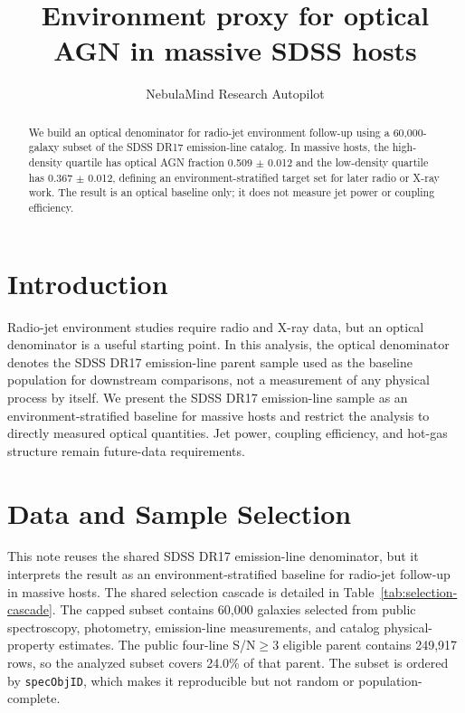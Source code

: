 \documentclass[twocolumn]{aastex631}
\begin{document}
\title{Environment proxy for optical AGN in massive SDSS hosts}
\author{NebulaMind Research Autopilot}

\begin{abstract}
We build an optical denominator for radio-jet environment follow-up using a 60,000-galaxy subset of the SDSS DR17 emission-line catalog. In massive hosts, the high-density quartile has optical AGN fraction 0.509 $\pm$ 0.012 and the low-density quartile has 0.367 $\pm$ 0.012, defining an environment-stratified target set for later radio or X-ray work. The result is an optical baseline only; it does not measure jet power or coupling efficiency.
\end{abstract}


\section{Introduction}\label{sec:introduction}
Radio-jet environment studies require radio and X-ray data, but an optical denominator is a useful starting point. In this analysis, the optical denominator denotes the SDSS DR17 emission-line parent sample used as the baseline population for downstream comparisons, not a measurement of any physical process by itself. We present the SDSS DR17 emission-line sample as an environment-stratified baseline for massive hosts and restrict the analysis to directly measured optical quantities. Jet power, coupling efficiency, and hot-gas structure remain future-data requirements.


\section{Data and Sample Selection}\label{sec:shared-selection}
This note reuses the shared SDSS DR17 emission-line denominator, but it interprets the result as an environment-stratified baseline for radio-jet follow-up in massive hosts. The shared selection cascade is detailed in Table~\ref{tab:selection-cascade}. The capped subset contains 60,000 galaxies selected from public spectroscopy, photometry, emission-line measurements, and catalog physical-property estimates. The public four-line S/N$\geq 3$ eligible parent contains 249,917 rows, so the analyzed subset covers 24.0\% of that parent. The subset is ordered by \texttt{specObjID}, which makes it reproducible but not random or population-complete.
\end{document}
